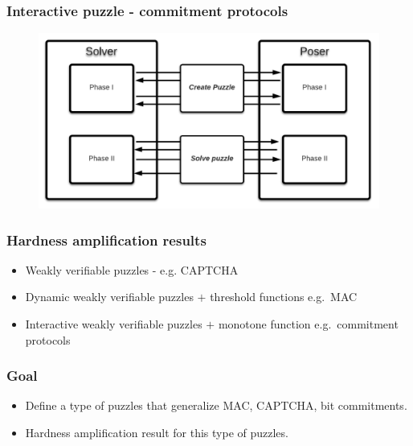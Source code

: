 \documentclass[first, handout,notes]{ETHclass}
\begin{document}
\begin{frame}[t]
  \frametitle{Interactive puzzle - commitment protocols}
  \begin{figure}
    \includegraphics[scale=0.43]{images/IntProtocol.pdf}
  \end{figure}
\end{frame}

\begin{frame}[t]
  \frametitle{Hardness amplification results}
  \begin{itemize}
    \item<1-3> Weakly verifiable puzzles - e.g. CAPTCHA \cite{canetti2005hardness}
    \item<2-3> Dynamic weakly verifiable puzzles $+$ threshold functions e.g.~MAC \cite{dodis2009security}
    \item<3> Interactive weakly verifiable puzzles $+$ monotone function e.g.~commitment protocols \cite{holenstein2011general}
  \end{itemize}
  \centering
\end{frame}

\begin{frame}[t]
  \frametitle{Goal}
  \begin{itemize}
    \item Define a type of puzzles that generalize MAC, CAPTCHA, bit commitments.
    \item Hardness amplification result for this type of puzzles.
  \end{itemize}
  \vspace{40pt}
  \begin{figure}
    \centering
  \end{figure}
\end{frame}
\end{document}
